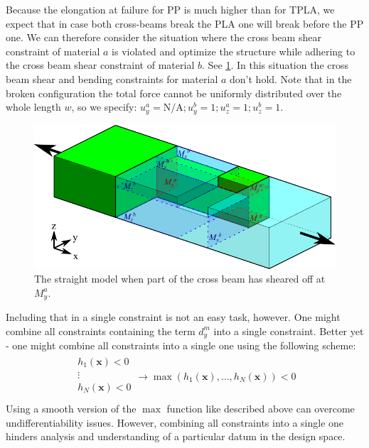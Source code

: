 Because the elongation at failure for PP is much higher than for TPLA, we expect that in case both cross-beams break the PLA one will break before the PP one.
We can therefore consider the situation where the cross beam shear constraint of material $a$ is violated and optimize the structure while adhering to the cross beam shear constraint of material $b$.
See \cref{fig:straight_model_broken}.
In this situation the cross beam shear and bending constraints for material $a$ don't hold.
Note that in the broken configuration the total force cannot be uniformly distributed over the whole length $w$, so we specify:
$
	u_y^a = \text{N/A};
	u_y^b = 1 ;
	u_z^a = 1 ;
	u_z^b = 1
$.

\begin{figure}[H]
	\centering
	\includegraphics[width=\columnwidth]{sources/method/straight_model_v3_broken.pdf}
	\caption{The straight model when part of the cross beam has sheared off at $M_y^a$.}
	\label{fig:straight_model_broken}
\end{figure}

Including that in a single constraint is not an easy task, however.
One might combine all constraints containing the term $d_y^m$ into a single constraint.
Better yet - one might combine all constraints into a single one using the following scheme:
\begin{align*}
	\begin{array}{l}
		h_1(\mathbf{x}) < 0 \\
		\vdots \\
		h_N(\mathbf{x}) < 0 \\
	\end{array}
	\to
	\max \left(h_1(\mathbf{x}), \dots, h_N(\mathbf{x}) \right) < 0
\end{align*}
Using a smooth version of the $\max$ function like described above can overcome undifferentiability issues.
However, combining all constraints into a single one hinders analysis and understanding of a particular datum in the design space.


